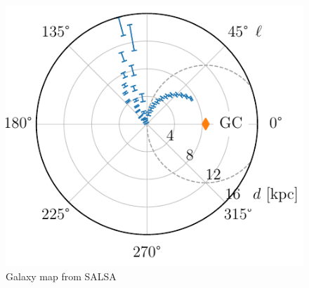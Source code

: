 \begin{figure}[htbp]
\begin{minipage}[t]{0.5\textwidth}
        \includegraphics[scale=1]{figures/SALSA_galaxy_map.pdf}
        \caption{Galaxy map from SALSA}
        \label{fig:SALSA_galaxy_map}
    \end{minipage}
\end{figure}